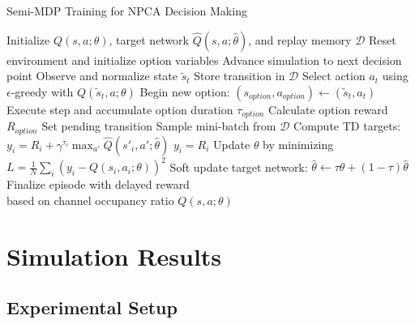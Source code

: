 \documentclass[conference]{IEEEtran}
\begin{document}
\begin{algorithm}[htbp]
\caption{Semi-MDP Training for NPCA Decision Making}
\label{alg:semi_mdp_npca}
\begin{algorithmic}[1]
\STATE Initialize $Q(s,a;\theta)$, target network $\hat{Q}(s,a;\hat{\theta})$, and replay memory $\mathcal{D}$
    \STATE Reset environment and initialize option variables
        \STATE Advance simulation to next decision point
            \STATE Observe and normalize state $\tilde{s}_t$ 
                \STATE Store transition in $\mathcal{D}$
            \ENDIF
            \STATE Select action $a_t$ using $\epsilon$-greedy with $Q(\tilde{s}_t, a; \theta)$
            \STATE Begin new option: $(s_{option}, a_{option}) \leftarrow (\tilde{s}_t, a_t)$
        \ENDIF
        \STATE Execute step and accumulate option duration $\tau_{option}$
            \STATE Calculate option reward $R_{option}$
            \STATE Set pending transition
        \ENDIF
            \STATE Sample mini-batch from $\mathcal{D}$
            \STATE Compute TD targets: \\ 
                    \STATE $y_i = R_i + \gamma^{\tau_i} \max_{a'} \hat{Q}(s'_i, a'; \hat{\theta})$
                \ELSE
                    \STATE $y_i = R_i$
                \ENDIF
            \STATE Update $\theta$ by minimizing \\ 
            \hspace*{\algorithmicindent} $L = \frac{1}{N} \sum_i (y_i - Q(s_i, a_i; \theta))^2$
            \STATE Soft update target network: $\hat{\theta} \leftarrow \tau \theta + (1-\tau) \hat{\theta}$
        \ENDIF
    \ENDFOR
    \STATE Finalize episode with delayed reward \\ 
    \hspace*{\algorithmicindent} based on channel occupancy ratio
\ENDFOR
\RETURN $Q(s,a;\theta)$
\end{algorithmic}
\end{algorithm}

\section{Simulation Results}

\subsection{Experimental Setup}
\end{document}
